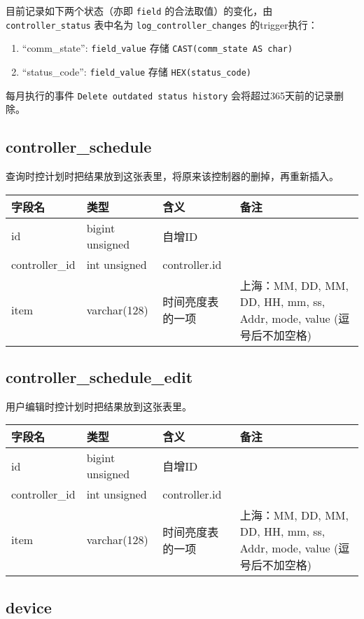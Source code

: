 目前记录如下两个状态（亦即 \texttt{field} 的合法取值）的变化，由
\texttt{controller\_status} 表中名为 \texttt{log\_controller\_changes}
的trigger执行：

\begin{enumerate}
\def\labelenumi{\arabic{enumi}.}
\itemsep1pt\parskip0pt
\item
  ``comm\_state'': \texttt{field\_value} 存储
  \texttt{CAST(comm\_state AS char)}
\item
  ``status\_code'': \texttt{field\_value} 存储
  \texttt{HEX(status\_code)}
\end{enumerate}

每月执行的事件 \texttt{Delete outdated status history}
会将超过365天前的记录删除。

\subsection{controller\_schedule}\label{controllerux5fschedule}

查询时控计划时把结果放到这张表里，将原来该控制器的删掉，再重新插入。

\begin{longtabu}[c]{@{}lXXX@{}}
\toprule
字段名 & 类型 & 含义 & 备注\tabularnewline
\midrule
\endhead
id & bigint unsigned & 自增ID &\tabularnewline
controller\_id & int unsigned & controller.id &\tabularnewline
item & varchar(128) & 时间亮度表的一项 & 上海：MM, DD, MM, DD, HH, mm,
ss, Addr, mode, value (逗号后不加空格)\tabularnewline
\bottomrule
\end{longtabu}

\subsection{controller\_schedule\_edit}\label{controllerux5fscheduleux5fedit}

用户编辑时控计划时把结果放到这张表里。

\begin{longtabu}[c]{@{}lXXX@{}}
\toprule
字段名 & 类型 & 含义 & 备注\tabularnewline
\midrule
\endhead
id & bigint unsigned & 自增ID &\tabularnewline
controller\_id & int unsigned & controller.id &\tabularnewline
item & varchar(128) & 时间亮度表的一项 & 上海：MM, DD, MM, DD, HH, mm,
ss, Addr, mode, value (逗号后不加空格)\tabularnewline
\bottomrule
\end{longtabu}

\subsection{device}\label{device}

